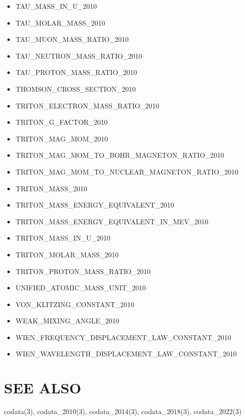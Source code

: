 \begin{itemize}
\item TAU\_MASS\_IN\_U\_2010
\item TAU\_MOLAR\_MASS\_2010
\item TAU\_MUON\_MASS\_RATIO\_2010
\item TAU\_NEUTRON\_MASS\_RATIO\_2010
\item TAU\_PROTON\_MASS\_RATIO\_2010
\item THOMSON\_CROSS\_SECTION\_2010
\item TRITON\_ELECTRON\_MASS\_RATIO\_2010
\item TRITON\_G\_FACTOR\_2010
\item TRITON\_MAG\_MOM\_2010
\item TRITON\_MAG\_MOM\_TO\_BOHR\_MAGNETON\_RATIO\_2010
\item TRITON\_MAG\_MOM\_TO\_NUCLEAR\_MAGNETON\_RATIO\_2010
\item TRITON\_MASS\_2010
\item TRITON\_MASS\_ENERGY\_EQUIVALENT\_2010
\item TRITON\_MASS\_ENERGY\_EQUIVALENT\_IN\_MEV\_2010
\item TRITON\_MASS\_IN\_U\_2010
\item TRITON\_MOLAR\_MASS\_2010
\item TRITON\_PROTON\_MASS\_RATIO\_2010
\item UNIFIED\_ATOMIC\_MASS\_UNIT\_2010
\item VON\_KLITZING\_CONSTANT\_2010
\item WEAK\_MIXING\_ANGLE\_2010
\item WIEN\_FREQUENCY\_DISPLACEMENT\_LAW\_CONSTANT\_2010
\item WIEN\_WAVELENGTH\_DISPLACEMENT\_LAW\_CONSTANT\_2010
\end{itemize}

\section*{SEE ALSO}
codata(3), codata\_2010(3), codata\_2014(3), codata\_2018(3), codata\_2022(3)
